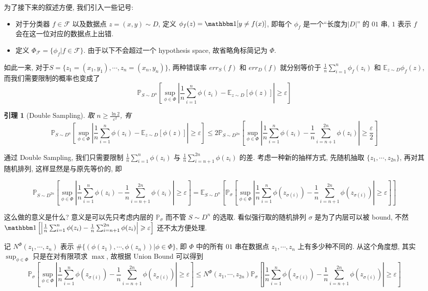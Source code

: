\documentclass[8pt]{article}
\theoremstyle{compact}
\newtheorem{lemma}{引理}[section]
\def\le{\leqslant}
\def\ge{\geqslant}
\begin{document}
为了接下来的叙述方便, 我们引入一些记号:
\begin{itemize}
	\item 对于分类器 $f \in \mathcal F$ 以及数据点 $z = (x, y) \sim D$, 定义 $\phi_f(z) = \mathbbm 1[y \neq f(x)]$, 即每个 $\phi_f$ 是一个“长度为$|D|$” 的 $01$ 串, $1$ 表示 $f$ 会在这一位对应的数据点上出错.
	\item 定义 $\Phi_{\mathcal F} = \{\phi_f | f \in \mathcal F\}$. 由于以下不会超过一个 hypothesis space, 故省略角标简记为 $\Phi$.
\end{itemize}

如此一来, 对于$S = \{z_1 = (x_1, y_1), \cdots, z_n = (x_n, y_n)\}$, 两种错误率 $err_S(f)$ 和 $err_D(f)$ 就分别等价于 $\frac1n \sum\limits_{i=1}^{n}\phi_f(z_i)$ 和 $\mathbb E_{z \sim D}\phi_f(z)$, 而我们需要限制的概率也变成了 $$\mathbb P_{S \sim D^n}\left[\sup_{\phi \in \Phi}\left|\frac1n\sum_{i=1}^{n}\phi(z_i) - \mathbb E_{z \sim D}[\phi(z)]\right| \ge \varepsilon\right]$$

\begin{lemma}[Double Sampling]
	取 $n \ge \frac{\ln 2}{\varepsilon^2}$, 有
	$$\mathbb P_{S \sim D^n}\left[\sup_{\phi \in \Phi}\left|\frac1n\sum_{i=1}^{n}\phi(z_i) - \mathbb E_{z \sim D}[\phi(z)]\right| \ge \varepsilon\right] \le 2\mathbb P_{S \sim D^{2n}}\left[\sup_{\phi \in \Phi}\left|\frac1n\sum_{i=1}^{n}\phi(z_i) - \frac1n\sum_{i=n+1}^{2n}\phi(z_i)\right| \ge \frac{\varepsilon}{2}\right]$$
\end{lemma}

通过 Double Sampling, 我们只需要限制 $\frac1n\sum\limits_{i=1}^{n}\phi(z_i)$ 与 $\frac1n\sum\limits_{i=n+1}^{2n}\phi(z_i)$ 的差. 考虑一种新的抽样方式, 先随机抽取 $\{z_1, \cdots, z_{2n}\}$, 再对其随机排列, 这样显然是与原先等价的, 即

$$\mathbb P_{S \sim D^{2n}}\left[\sup_{\phi \in \Phi}\left|\frac1n\sum_{i=1}^{n}\phi(z_i) - \frac1n\sum_{i=n+1}^{2n}\phi(z_i)\right| \ge \varepsilon\right] = \mathbb E_{S \sim D^n} \left[\mathbb P_{\sigma}\left[\sup_{\phi \in \Phi}\left|\frac1n\sum_{i=1}^{n}\phi(z_{\sigma(i)}) - \frac1n\sum_{i=n+1}^{2n}\phi(z_{\sigma(i)})\right| \ge \varepsilon\right]\right]$$

这么做的意义是什么? 意义是可以先只考虑内层的 $\mathbb P_{\sigma}$ 而不管 $S \sim D^n$ 的选取. 看似强行取的随机排列 $\sigma$ 是为了内层可以被 bound, 不然 $\mathbbm 1\left[\left|\frac1n\sum_{i=1}^{n}\phi(z_i) - \frac1n\sum_{i=n+1}^{2n}\phi(z_i)\right| \ge \varepsilon \right]$ 还不太方便处理.

记 $N^{\Phi}(z_1, \cdots, z_n)$ 表示 $\#\{(\phi(z_1), \cdots, \phi(z_n)) | \phi \in \Phi\}$, 即 $\Phi$ 中的所有 $01$ 串在数据点 $z_1, \cdots, z_n$ 上有多少种不同的. 从这个角度想, 其实 $\sup_{\phi \in \Phi}$ 只是在对有限项求 $\max$, 故根据 Union Bound 可以得到 $$\mathbb P_{\sigma}\left[\sup_{\phi \in \Phi}\left|\frac1n\sum_{i=1}^{n}\phi(z_{\sigma(i)}) - \frac1n\sum_{i=n+1}^{2n}\phi(z_{\sigma(i)})\right| \ge \varepsilon\right] \le N^{\Phi}(z_1, \cdots, z_{2n})\mathbb P_{\sigma}\left[\left|\frac1n\sum_{i=1}^{n}\phi(z_{\sigma(i)}) - \frac1n\sum_{i=n+1}^{2n}\phi(z_{\sigma(i)})\right| \ge \varepsilon\right]$$
\end{document}
